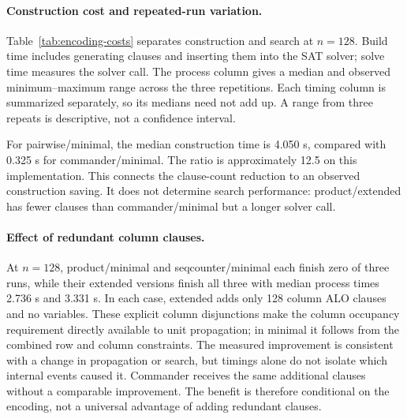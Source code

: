 \paragraph{Construction cost and repeated-run variation.}
Table~\ref{tab:encoding-costs} separates construction and search at $n=128$.
Build time includes generating clauses and inserting them into the SAT
solver; solve time measures the solver call. The process column gives a
median and observed minimum--maximum range across the three repetitions.
Each timing column is summarized separately, so its medians need not add
up. A range from three repeats is descriptive, not a confidence interval.
\begin{table}[pos=htbp]
\centering\small
\caption{Encoding-study times at $n=128$, in seconds. Completed cells
contain three valid solutions. No component times are imputed for timeouts.}
\label{tab:encoding-costs}
\end{table}
\FloatBarrier
For pairwise/minimal, the median construction time is 4.050 s, compared with 0.325 s for commander/minimal. The ratio is approximately 12.5 on this implementation. This connects the clause-count reduction to an observed construction saving. It does not determine search performance: product/extended has fewer clauses than commander/minimal but a longer solver call.

\paragraph{Effect of redundant column clauses.}
At $n=128$, product/minimal and seqcounter/minimal each finish zero of three runs, while their extended versions finish all three with median process times 2.736 s and 3.331 s. In each case, extended adds only 128 column ALO clauses and no variables. These explicit column disjunctions make the column occupancy requirement directly available to unit propagation; in minimal it follows from the combined row and column constraints. The measured improvement is consistent with a change in propagation or search, but timings alone do not isolate which internal events caused it. Commander receives the same additional clauses without a comparable improvement. The benefit is therefore conditional on the encoding, not a universal advantage of adding redundant clauses.
